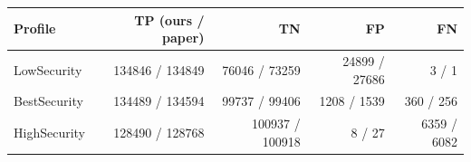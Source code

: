 {\footnotesize
\begin{tabular}{lrrrr}
\toprule
\textbf{Profile} & \textbf{TP (ours / paper)} & \textbf{TN} & \textbf{FP} & \textbf{FN} \\
\midrule
LowSecurity & 134846 / 134849 & 76046 / 73259 & 24899 / 27686 & 3 / 1 \\
BestSecurity & 134489 / 134594 & 99737 / 99406 & 1208 / 1539 & 360 / 256 \\
HighSecurity & 128490 / 128768 & 100937 / 100918 & 8 / 27 & 6359 / 6082 \\
\bottomrule
\end{tabular}
}

